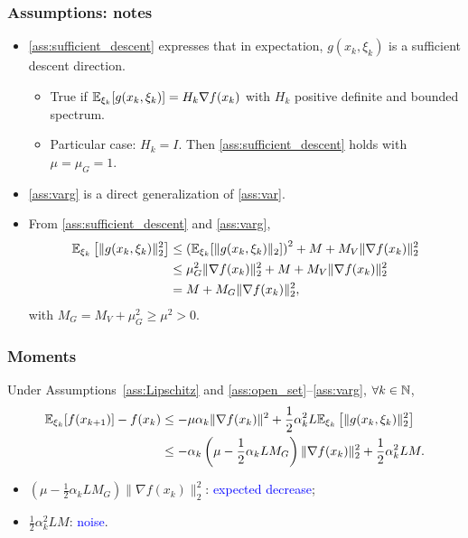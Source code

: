 \documentclass[usepdftitle=false, aspectratio=169]{beamer}
\begin{document}
\begin{frame}
\frametitle{Assumptions: notes}

\begin{itemize}
\item
\ref{ass:sufficient_descent} expresses that in expectation, $g(x_k, \xi_k)$ is a sufficient descent direction.
\begin{itemize}
	\item True if ${\mathbb{E}}_{\xi_k} [g(x_k, \xi_k)] = H_k \nabla f(x_k)$ with $H_k$ positive definite and bounded spectrum.
	\item Particular case: $H_k = I$. Then \ref{ass:sufficient_descent} holds with $\mu = \mu_G = 1$. 
\end{itemize}
\item 
\ref{ass:varg} is a direct generalization of \ref{ass:var}.
\item
From \ref{ass:sufficient_descent} and \ref{ass:varg},
\begin{align*}
{\mathbb{E}}_{\xi_k} \left[ \| g(x_k, \xi_k) \|^2_2 \right]
& \leq \left( {\mathbb{E}}_{\xi_k} [\| g(x_k, \xi_k) \|_2] \right)^2 + M + M_V \| \nabla f(x_k) \|_2^2 \\
& \leq \mu_G^2 \| \nabla f(x_k) \|_2^2 + M + M_V \| \nabla f(x_k) \|_2^2 \\
& = M + M_G \| \nabla f(x_k) \|_2^2,
\end{align*}
with $M_G = M_V + \mu_G^2 \geq \mu^2 > 0$.
\end{itemize}
\end{frame}

\begin{frame}
\frametitle{Moments}

\begin{theorem}[Moments]
	Under Assumptions~\ref{ass:Lipschitz} and \ref{ass:open_set}--\ref{ass:varg}, $\forall k \in {\mathbb{N}}$,
	\begin{align*}
		{\mathbb{E}}_{\xi_k}[f(x_{k+1})] - f(x_k)
		& \leq - \mu \alpha_k \| \nabla f(x_k) \|^2
		+ \frac{1}{2} \alpha_k^2 L {\mathbb{E}}_{\xi_k} \left[ \| g(x_k, \xi_k )\|_2^2 \right] \\
		& \leq - \alpha_k\left( \mu -\frac{1}{2}\alpha_k LM_G \right) \| \nabla f(x_k) \|_2^2
		+ \frac{1}{2} \alpha_k^2 LM.
	\end{align*}
\end{theorem}
\begin{itemize}
	\item $\left( \mu -\frac{1}{2}\alpha_k LM_G \right) \| \nabla f(x_k) \|_2^2$: \textcolor{blue}{expected decrease};
	\item $\frac{1}{2} \alpha_k^2 LM$: \textcolor{blue}{noise}.
\end{itemize}
\end{frame}
\end{document}
